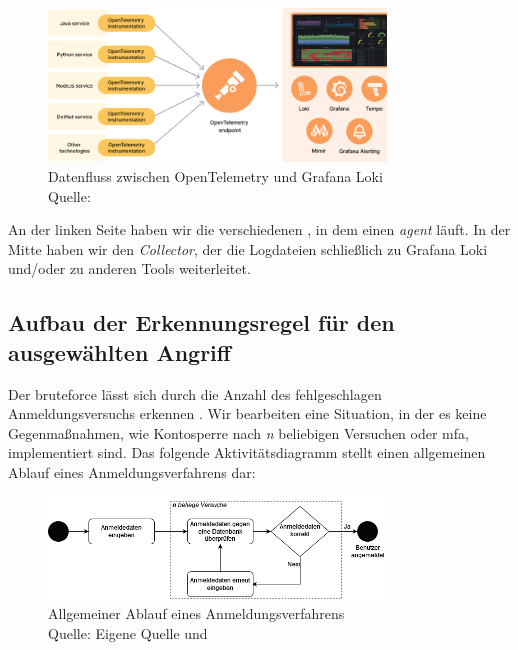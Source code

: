 \begin{figure}[H]
   \centering
   \includegraphics[width=0.8\textwidth]{assets/Grafana_OpenTelemtry.png}
   \caption{Datenfluss zwischen OpenTelemetry und Grafana Loki\\Quelle: \citep{Grafana_WhatOpentelemetry}}
   \centering
\end{figure}

An der linken Seite haben wir die verschiedenen , in dem einen \textit{agent} läuft. In der Mitte haben wir den \textit{Collector}, der die Logdateien schließlich zu Grafana Loki und/oder zu anderen Tools weiterleitet.

\newpage
\subsection{Aufbau der Erkennungsregel für den ausgewählten Angriff}
Der \gls{bruteforce} lässt sich durch die Anzahl des fehlgeschlagen Anmeldungsversuchs erkennen \citep{Selvaganesh_SplunkBruteForce}. Wir bearbeiten eine Situation, in der es keine Gegenmaßnahmen, wie Kontosperre nach \textit{n} beliebigen Versuchen oder \gls{mfa}, implementiert sind. Das folgende Aktivitätsdiagramm stellt einen allgemeinen Ablauf eines Anmeldungsverfahrens dar:

\begin{figure}[H]
   \centering
   \includegraphics[width=0.8\textwidth]{assets/Anmeldeverfahren.drawio.png}
   \caption{Allgemeiner Ablauf eines Anmeldungsverfahrens \\Quelle: Eigene Quelle und \citep{Selvaganesh_SplunkBruteForce}}
   \centering
\end{figure}

